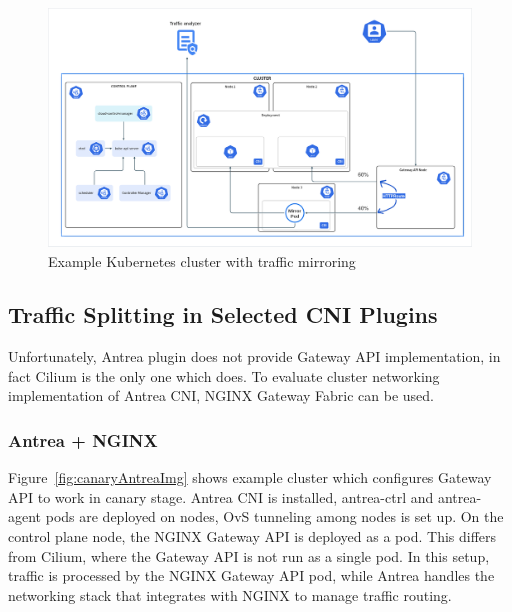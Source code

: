 \begin{figure}[H]
    \centering
    \includegraphics[width=1\columnwidth]{images/ingress.png}
    \caption{Example Kubernetes cluster with traffic mirroring}
    \label{fig:mirroringImg}
\end{figure}


\subsection{Traffic Splitting in Selected CNI Plugins}
\label{subsection:trafficSplitting}

Unfortunately, Antrea plugin does not provide Gateway API implementation, in fact Cilium is the only one which does. To evaluate cluster networking implementation of Antrea CNI, NGINX Gateway Fabric can be used. 



\subsubsection{Antrea + NGINX}
\label{subsection:antreaIngress}

Figure~\ref{fig:canaryAntreaImg} shows example cluster which configures Gateway API to work in canary stage. Antrea CNI is installed, antrea-ctrl and antrea-agent pods are deployed on nodes, OvS tunneling among nodes is set up. On the control plane node, the NGINX Gateway API is deployed as a pod. This differs from Cilium, where the Gateway API is not run as a single pod. In this setup, traffic is processed by the NGINX Gateway API pod, while Antrea handles the networking stack that integrates with NGINX to manage traffic routing.

